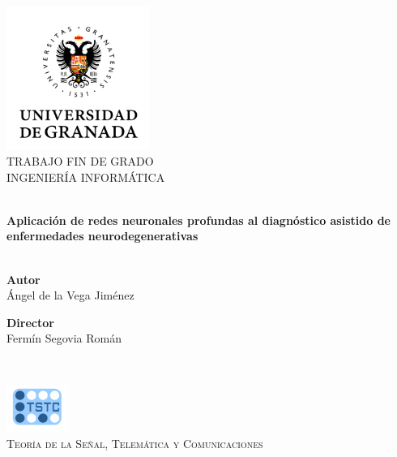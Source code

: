 \begin{titlepage}
	
\vbox{ }

\vbox{ }

\begin{center}
	
\includegraphics[width=0.35\textwidth]{./sections/img/logo_ugr.png}\\[2cm]
\textsc{\LARGE TRABAJO FIN DE GRADO}\\[0.5CM]
\textsc{\Large INGENIERÍA INFORMÁTICA}\\[0.5cm]
\vbox{ }

\HRule \\[0.4cm]
{\LARGE \bfseries Aplicación de redes neuronales profundas al diagnóstico asistido de enfermedades neurodegenerativas}\\[0.4cm]
\HRule \\[1.5cm]

\begin{minipage}{0.4\textwidth}
\begin{flushleft} \large
{\bfseries Autor} \\
Ángel de la Vega Jiménez
\end{flushleft}
\end{minipage}
\begin{minipage}{0.4\textwidth}
\begin{flushright} \large
{\bfseries Director} \\
Fermín Segovia Román
\end{flushright}
\end{minipage}\\[2cm]
\vfill

\includegraphics[width=0.15\textwidth]{./sections/img/tstc_logo.png}\\
\textsc{Teoría de la Señal, Telemática y Comunicaciones}\\[0.5cm]

{ \large \Today}

\end{center}
\end{titlepage}